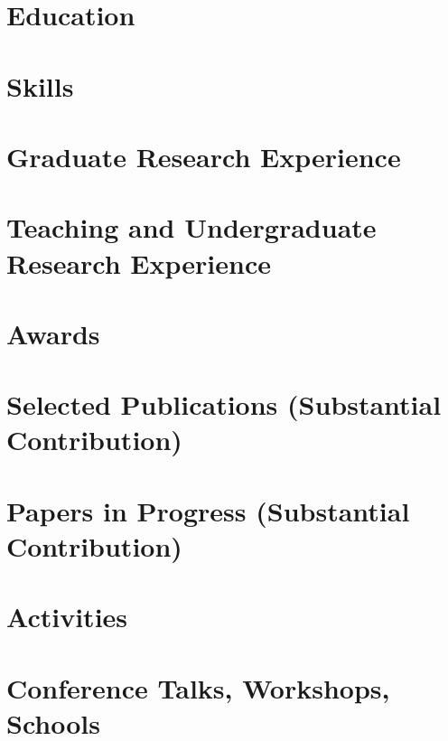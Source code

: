 \documentclass[letter,10pt]{article}
\begin{document}


\section{Education}


\section{Skills}


\section{Graduate Research Experience}


\newpage

\section{Teaching and Undergraduate Research Experience}



\section{Awards}


\section{Selected Publications (Substantial Contribution)}


\section{Papers in Progress (Substantial Contribution)}


\section{Activities}


\section{Conference Talks, Workshops, Schools}

\end{document}
